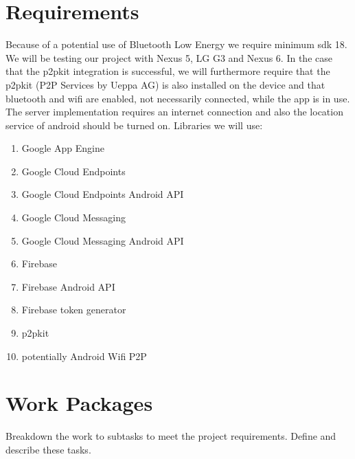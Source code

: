 \documentclass{report}
\begin{document}
\section{Requirements}
Because of a potential use of Bluetooth Low Energy we require minimum sdk 18. We will be testing our project with Nexus 5, LG G3 and Nexus 6. In the case that the p2pkit integration is successful, we will furthermore require that the p2pkit (P2P Services by Ueppa AG) is also installed on the device and that bluetooth and wifi are enabled, not necessarily connected, while the app is in use. The server implementation requires an internet connection and also the location service of android should be turned on. 
Libraries we will use:
\begin{enumerate}
	\item
	Google App Engine~\cite{google_app_engine}
	\item
	Google Cloud Endpoints~\cite{google_cloud_endpoints}
	\item
	Google Cloud Endpoints Android API~\cite{google_cloud_endpoints_android}
	\item
	Google Cloud Messaging~\cite{google_cloud_messaging}
	\item
	Google Cloud Messaging Android API~\cite{google_cloud_messaging_android}
	\item
	Firebase~\cite{firebase}
	\item
	Firebase Android API~\cite{firebase_java}
	\item
	Firebase token generator~\cite{firebase_token_generator}
	\item
	p2pkit~\cite{p2pkit}
	\item
	potentially Android Wifi P2P~\cite{android_wifi_p2p}
\end{enumerate}

\section{Work Packages}
Breakdown the work to subtasks to meet the project requirements.
Define and describe these tasks.
\end{document}
